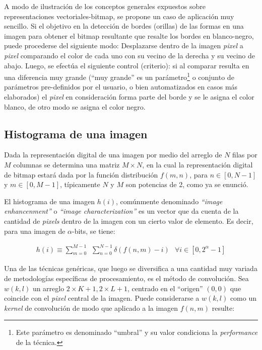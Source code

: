 A modo de ilustraci\'on de los conceptos generales expuestos sobre representaciones vectoriales-bitmap, se propone un caso de aplicaci\'on muy sencillo.
%
Si el objetivo en la detecci\'on de bordes (orillas) de las formas en una imagen para obtener el bitmap resultante que resalte los bordes 
en blanco-negro, puede procederse del siguiente modo: Desplazarse dentro de la imagen \textit{pixel} a \textit{pixel} comparando el color de cada uno 
con su vecino de la derecha y su vecino de abajo. 
%
Luego, se efect\'ua el siguiente control (criterio): si al comparar resulta en una diferencia muy 
grande (``muy grande'' es un par\'ametro\footnote{Este par\'ametro es denominado ``umbral'' y su valor condiciona la \textit{performance} de la t\'ecnica.} 
o conjunto de par\'ametros pre-definidos por el usuario, o bien automatizados en casos m\'as elaborados) 
el \textit{pixel} en consideraci\'on forma parte del borde y se le asigna el color blanco, de otro modo se asigna el color negro.
%

\subsection{Histograma de una imagen}

Dada la representaci\'on digital de una imagen por medio del arreglo de $N$ filas por $M$ columnas se determina una matriz $M \times N$, en la cual la 
representaci\'on digital de bitmap estar\'a dada por la funci\'on distribuci\'on $f(m, n)$, para $n \in [0, N-1]$ y $m \in [0, M-1]$, t\'ipicamente
$N$ y $M$ son potencias de 2, como ya se enunci\'o.
%

%
El histograma de una imagen $h(i)$, com\'unmente denominado \textit{``image enhancenment''} o \textit{``image characterization''} es un vector que da cuenta de 
la cantidad de \textit{pixels} dentro de la imagen con un cierto valor de elemento.
%
Es decir, para una imagen de $\alpha$-bits, se tiene:
%

\begin{eqnarray}
	h(i) \equiv \sum _{m=0}^{M-1} \, \; \sum _{n=0}^{N-1} \delta(f(n, m) - i) \; \, \; \forall i \in [0, 2^{\alpha}-1]
\label{EqXXIII}
\end{eqnarray}

%
Una de las t\'ecnicas gen\'ericas, que luego se diversifica a una cantidad muy variada de metodolog\'ias espec\'ificas de procesamiento, es el m\'etodo de 
convoluci\'on.
%
Sea $w(k, l)$ un arreglo $2 \times K + 1, 2 \times L + 1$, centrado en el ``origen'' $(0, 0)$ que coincide con el \textit{pixel} central de la imagen.
%
Puede considerarse a $w(k, l)$ como un \textit{kernel} de convoluci\'on de modo que aplicado a la imagen $f(n, m)$ resulte:
%

